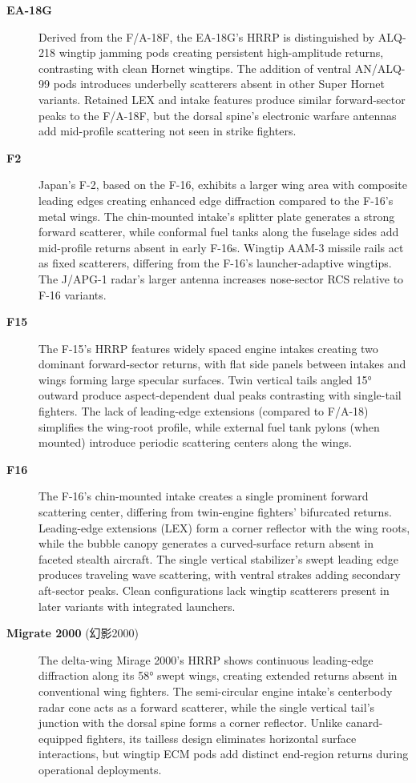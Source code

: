 {\begin{description}
    \item[\textbf{EA-18G}]
    Derived from the F/A-18F, the EA-18G’s HRRP is distinguished by ALQ-218 wingtip jamming pods creating persistent high-amplitude returns, contrasting with clean Hornet wingtips. The addition of ventral AN/ALQ-99 pods introduces underbelly scatterers absent in other Super Hornet variants. Retained LEX and intake features produce similar forward-sector peaks to the F/A-18F, but the dorsal spine’s electronic warfare antennas add mid-profile scattering not seen in strike fighters.

    \item[\textbf{F2}]
    Japan’s F-2, based on the F-16, exhibits a larger wing area with composite leading edges creating enhanced edge diffraction compared to the F-16’s metal wings. The chin-mounted intake’s splitter plate generates a strong forward scatterer, while conformal fuel tanks along the fuselage sides add mid-profile returns absent in early F-16s. Wingtip AAM-3 missile rails act as fixed scatterers, differing from the F-16’s launcher-adaptive wingtips. The J/APG-1 radar’s larger antenna increases nose-sector RCS relative to F-16 variants.

    \item[\textbf{F15}]
    The F-15’s HRRP features widely spaced engine intakes creating two dominant forward-sector returns, with flat side panels between intakes and wings forming large specular surfaces. Twin vertical tails angled 15° outward produce aspect-dependent dual peaks contrasting with single-tail fighters. The lack of leading-edge extensions (compared to F/A-18) simplifies the wing-root profile, while external fuel tank pylons (when mounted) introduce periodic scattering centers along the wings.

    \item[\textbf{F16}]
    The F-16’s chin-mounted intake creates a single prominent forward scattering center, differing from twin-engine fighters’ bifurcated returns. Leading-edge extensions (LEX) form a corner reflector with the wing roots, while the bubble canopy generates a curved-surface return absent in faceted stealth aircraft. The single vertical stabilizer’s swept leading edge produces traveling wave scattering, with ventral strakes adding secondary aft-sector peaks. Clean configurations lack wingtip scatterers present in later variants with integrated launchers.

    \item[\textbf{Migrate 2000} (幻影2000)]
    The delta-wing Mirage 2000’s HRRP shows continuous leading-edge diffraction along its 58° swept wings, creating extended returns absent in conventional wing fighters. The semi-circular engine intake’s centerbody radar cone acts as a forward scatterer, while the single vertical tail’s junction with the dorsal spine forms a corner reflector. Unlike canard-equipped fighters, its tailless design eliminates horizontal surface interactions, but wingtip ECM pods add distinct end-region returns during operational deployments.


\end{description}}
